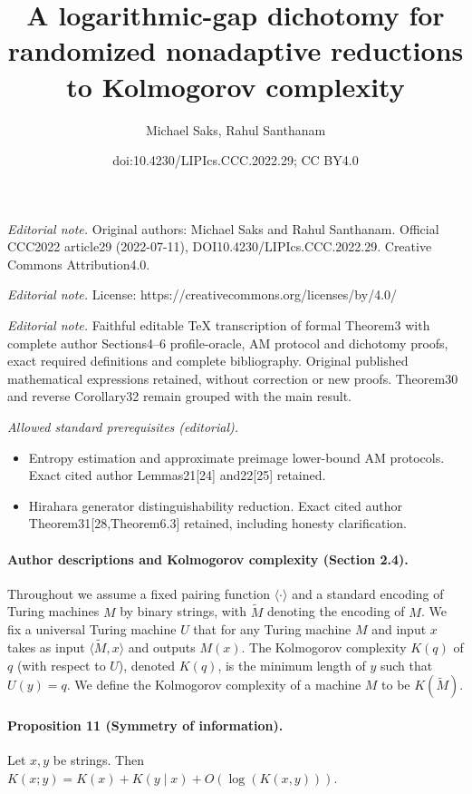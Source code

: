 \documentclass[10pt,a4paper]{article}
\title{A logarithmic-gap dichotomy for randomized nonadaptive reductions to Kolmogorov complexity}
\author{Michael Saks, Rahul Santhanam}
\date{doi:10.4230/LIPIcs.CCC.2022.29; CC BY4.0}
\begin{document}
\maketitle
\noindent\textit{Editorial note.} Original authors: Michael Saks and Rahul Santhanam. Official CCC2022 article29 (2022-07-11), DOI10.4230/LIPIcs.CCC.2022.29. Creative Commons Attribution4.0.\par\medskip
\noindent\textit{Editorial note.} License: https://creativecommons.org/licenses/by/4.0/\par\medskip
\noindent\textit{Editorial note.} Faithful editable TeX transcription of formal Theorem3 with complete author Sections4--6 profile-oracle, AM protocol and dichotomy proofs, exact required definitions and complete bibliography. Original published mathematical expressions retained, without correction or new proofs. Theorem30 and reverse Corollary32 remain grouped with the main result.\par\medskip
\noindent\textit{Allowed standard prerequisites (editorial).}\begin{itemize}
\item Entropy estimation and approximate preimage lower-bound AM protocols. Exact cited author Lemmas21[24] and22[25] retained.
\item Hirahara generator distinguishability reduction. Exact cited author Theorem31[28,Theorem6.3] retained, including honesty clarification.
\end{itemize}\medskip
\paragraph{Author descriptions and Kolmogorov complexity (Section 2.4).}
Throughout we assume a fixed pairing function $\langle\cdot\rangle$ and a standard encoding of Turing machines $M$ by binary strings, with $\widetilde M$ denoting the encoding of $M$.
We fix a universal Turing machine $U$ that for any Turing machine $M$ and input $x$ takes as input $\langle\widetilde M,x\rangle$ and outputs $M(x)$. The Kolmogorov complexity $K(q)$ of $q$ (with respect to $U$), denoted $K(q)$, is the minimum length of $y$ such that $U(y)=q$. We define the Kolmogorov complexity of a machine $M$ to be $K(\widetilde M)$.
\paragraph{Proposition 11 (Symmetry of information).}
Let $x,y$ be strings. Then $K(x;y)=K(x)+K(y\mid x)+O(\log(K(x,y)))$.
\end{document}

